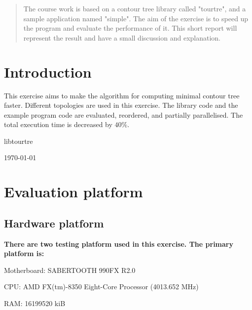 \documentclass[conference]{IEEEtran}
\begin{document}




\maketitle

\begin{abstract}
The course work is based on a contour tree library called "tourtre",
and a sample application named "simple". The aim of the exercise is to speed up the program and evaluate the performance of it. This short report will represent the result and have a small discussion and explanation. 
\end{abstract}

\IEEEpeerreviewmaketitle

\section{Introduction}

This exercise aims to make the algorithm for computing minimal contour tree faster. Different topologies are used in this exercise. The library code and the example program code are evaluated, reordered, and partially parallelised. The total execution time is decreased by $40\%$.

libtourtre \cite{libtourtre}

\hfill \today

\section{Evaluation platform}

\subsection{Hardware platform}

\textbf{There are two testing platform used in this exercise. The primary platform is:}

Motherboard:    SABERTOOTH 990FX R2.0

CPU:    AMD FX(tm)-8350 Eight-Core Processor (4013.652 MHz)

RAM:    16199520 kiB
\end{document}
